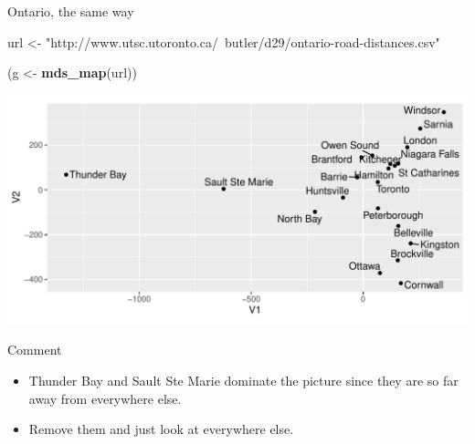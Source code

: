\documentclass[ignorenonframetext,]{beamer}
\newenvironment{Shaded}{\begin{snugshade}}{\end{snugshade}}
\newcommand{\KeywordTok}[1]{\textcolor[rgb]{0.13,0.29,0.53}{\textbf{#1}}}
\newcommand{\NormalTok}[1]{#1}
\newcommand{\StringTok}[1]{\textcolor[rgb]{0.31,0.60,0.02}{#1}}
\providecommand{\tightlist}{%
  \setlength{\itemsep}{0pt}\setlength{\parskip}{0pt}}
\begin{document}
\begin{frame}[fragile]{Ontario, the same way}
\protect\hypertarget{ontario-the-same-way}{}

\footnotesize

\begin{Shaded}
\begin{Highlighting}[]
\NormalTok{url <-}\StringTok{ }
\StringTok{  "http://www.utsc.utoronto.ca/~butler/d29/ontario-road-distances.csv"}
\end{Highlighting}
\end{Shaded}

\small

\begin{Shaded}
\begin{Highlighting}[]
\NormalTok{(g <-}\StringTok{ }\KeywordTok{mds_map}\NormalTok{(url))}
\end{Highlighting}
\end{Shaded}

\includegraphics{figure/unnamed-chunk-434-1.pdf} \normalsize

\end{frame}

\begin{frame}{Comment}
\protect\hypertarget{comment-1}{}

\begin{itemize}
\tightlist
\item
  Thunder Bay and Sault Ste Marie dominate the picture since they are so
  far away from everywhere else.
\item
  Remove them and just look at everywhere else.
\end{itemize}

\end{frame}
\end{document}
